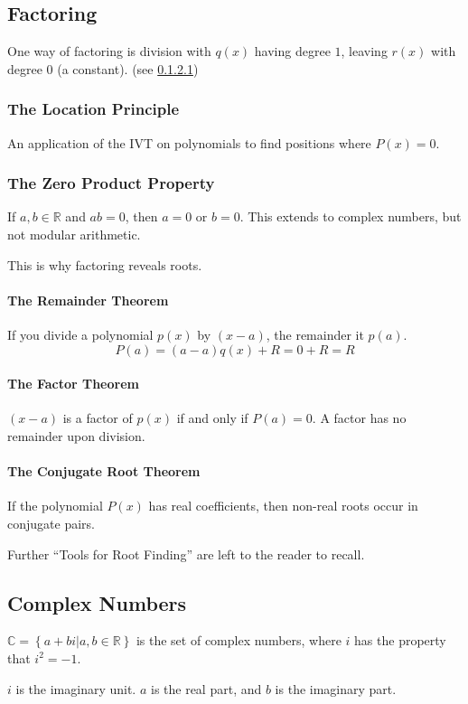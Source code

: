 \documentclass{article}
\begin{document}
\subsection{Factoring}
One way of factoring is division with $q(x)$ having degree $1$, leaving $r(x)$ with degree 0 (a constant). (see \ref{remainder})

\subsubsection{The Location Principle}
An application of the IVT on polynomials to find positions where $P(x) = 0$.

\subsubsection{The Zero Product Property}
If $a,b \in \mathbb{R}$ and $ab=0$, then $a=0$ or $b=0$. This extends to complex numbers, but not modular arithmetic.

This is why factoring reveals roots.

\paragraph{The Remainder Theorem}\label{remainder}
If you divide a polynomial $p(x)$ by $(x-a)$, the remainder it $p(a)$.
$$P(a) = (a-a)q(x) + R = 0 + R = R$$

\paragraph{The Factor Theorem} $(x-a)$ is a factor of $p(x)$ if and only if $P(a) = 0$. A factor has no remainder upon division.

\paragraph{The Conjugate Root Theorem} If the polynomial $P(x)$ has real coefficients, then non-real roots occur in conjugate pairs.

Further ``Tools for Root Finding'' are left to the reader to recall.

\subsection{Complex Numbers}
$\mathbb{C}=\left\{a+bi|a,b\in\mathbb{R}\right\}$ is the set of complex numbers, where $i$ has the property that $i^2 = -1$.

$i$ is the imaginary unit. $a$ is the real part, and $b$ is the imaginary part.
\end{document}
